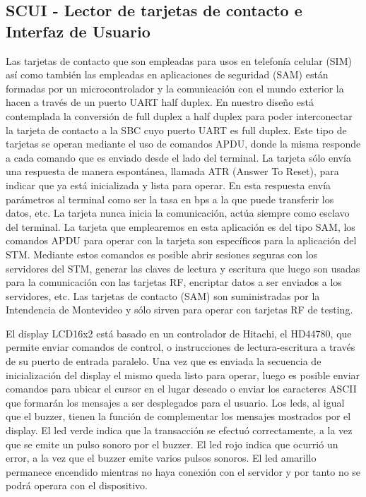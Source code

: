 \subsection{SCUI - Lector de tarjetas de contacto e Interfaz de Usuario}

Las tarjetas de contacto que son empleadas para usos en telefonía celular (SIM) así
como también las empleadas en aplicaciones de seguridad (SAM) están formadas por
un microcontrolador y la comunicación con el mundo exterior la hacen a través de un
puerto UART half duplex. En nuestro diseño está contemplada la conversión de full
duplex a half duplex para poder interconectar la tarjeta de contacto a la SBC cuyo
puerto UART es full duplex.
Este tipo de tarjetas se operan mediante el uso de comandos APDU, donde la misma
responde a cada comando que es enviado desde el lado del terminal. La tarjeta sólo
envía una respuesta de manera espontánea, llamada ATR (Answer To Reset), para
indicar que ya está inicializada y lista para operar. En esta respuesta envía parámetros
al terminal como ser la tasa en bps a la que puede transferir los datos, etc. La tarjeta
nunca inicia la comunicación, actúa siempre como esclavo del terminal. La tarjeta
que emplearemos en esta aplicación es del tipo SAM, los comandos APDU para
operar con la tarjeta son específicos para la aplicación del STM. Mediante estos
comandos es posible abrir sesiones seguras con los servidores del STM, generar las
claves de lectura y escritura que luego son usadas para la comunicación con las
tarjetas RF, encriptar datos a ser enviados a los servidores, etc.
Las tarjetas de contacto (SAM) son suministradas por la Intendencia de Montevideo
y sólo sirven para operar con tarjetas RF de testing.


El display LCD16x2 está basado en un controlador de Hitachi, el HD44780, que
permite enviar comandos de control, o instrucciones de lectura-escritura a través de
su puerto de entrada paralelo. Una vez que es enviada la secuencia de inicialización
del display el mismo queda listo para operar, luego es posible enviar comandos para
ubicar el cursor en el lugar deseado o enviar los caracteres ASCII que formarán los
mensajes a ser desplegados para el usuario.
Los leds, al igual que el buzzer, tienen la función de complementar los mensajes
mostrados por el display. El led verde indica que la transacción se efectuó
correctamente, a la vez que se emite un pulso sonoro por el buzzer. El led rojo indica
que ocurrió un error, a la vez que el buzzer emite varios pulsos sonoros. El led
amarillo permanece encendido mientras no haya conexión con el servidor y por tanto
no se podrá operara con el dispositivo.


